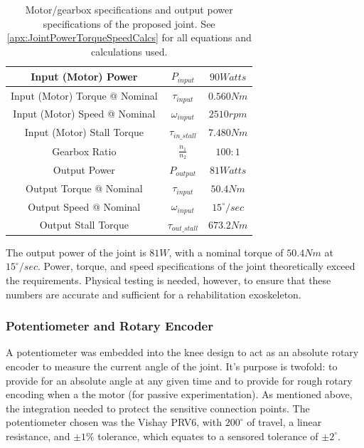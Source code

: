 \begin{table}
    \centering
    \begin{tabular}{||c|c|c||}
        \hline
        Input (Motor) Power & \(P_{input}\) & \(90 Watts\) \\
        \hline
        Input (Motor) Torque @ Nominal & \(\tau_{input}\) & \(0.560 Nm\) \\
        \hline
        Input (Motor) Speed @ Nominal & \(\omega_{input}\) & \(2510 rpm\) \\
        \hline
        Input (Motor) Stall Torque & \(\tau_{in\_stall}\) & \(7.480 Nm\) \\
        \hline \hline
        Gearbox Ratio & \(\frac{n_1}{n_2}\) & \(100:1\) \\
        \hline \hline
        Output Power & \(P_{output}\) & \(81 Watts\) \\
        \hline
        Output Torque @ Nominal & \(\tau_{input}\) & \(50.4 Nm\) \\
        \hline
        Output Speed @ Nominal & \(\omega_{input}\) & \(15^\circ/sec\) \\
        \hline
        Output Stall Torque & \(\tau_{out\_stall}\) & \(673.2 Nm\) \\
        \hline
    \end{tabular}
    \caption{Motor/gearbox specifications and output power specifications of the proposed joint. See \autoref{apx:JointPowerTorqueSpeedCalcs} for all equations and calculations used.}
    \label{table:MotorGearboxSpecs}
\end{table}

The output power of the joint is \(81 W\), with a nominal torque of \(50.4 Nm\) at \(15^\circ/sec\). Power, torque, and speed specifications of the joint theoretically exceed the requirements. Physical testing is needed, however, to ensure that these numbers are accurate and sufficient for a rehabilitation exoskeleton.
 
\subsubsection{Potentiometer and Rotary Encoder}
A potentiometer was embedded into the knee design to act as an absolute rotary encoder to measure the current angle of the joint. It's purpose is twofold: to provide for an absolute angle at any given time and to provide for rough rotary encoding when a the motor (for passive experimentation). As mentioned above, the integration needed to protect the sensitive connection points. The potentiometer chosen was the Vishay PRV6, with \(200^\circ\) of travel, a linear resistance, and \(\pm 1\%\) tolerance, which equates to a sensored tolerance of \(\pm 2^\circ\). 

